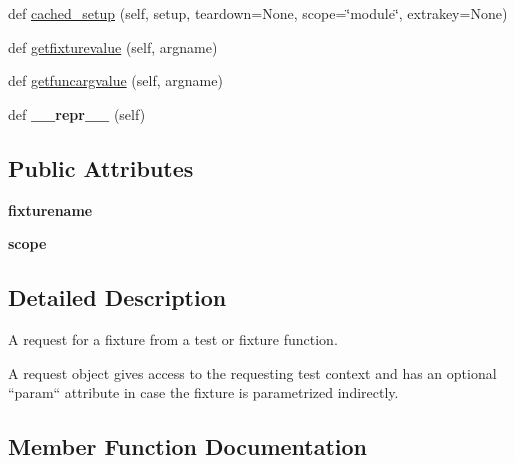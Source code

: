 \begin{DoxyCompactItemize}
def \hyperlink{class__pytest_1_1fixtures_1_1_fixture_request_a775e63459d22474875baaff278273220}{cached\+\_\+setup} (self, setup, teardown=None, scope=\char`\"{}module\char`\"{}, extrakey=None)
\item 
def \hyperlink{class__pytest_1_1fixtures_1_1_fixture_request_adcdc72e4da6ef0a8fe5a58f4f6800d2f}{getfixturevalue} (self, argname)
\item 
def \hyperlink{class__pytest_1_1fixtures_1_1_fixture_request_ad3fb29fde8a0deb9f3f84d9b7de5fa78}{getfuncargvalue} (self, argname)
\item 
\mbox{\label{class__pytest_1_1fixtures_1_1_fixture_request_a508e042f6218eada7cf94ede7c67f9e1}} 
def {\bfseries \+\_\+\+\_\+repr\+\_\+\+\_\+} (self)
\end{DoxyCompactItemize}
\subsection*{Public Attributes}
\begin{DoxyCompactItemize}
\item 
\mbox{\label{class__pytest_1_1fixtures_1_1_fixture_request_adaa4fc3a2be3498563ef8a8e96fb65e8}} 
{\bfseries fixturename}
\item 
\mbox{\label{class__pytest_1_1fixtures_1_1_fixture_request_ad89fd77bd665bb8e594f2a9e124e9122}} 
{\bfseries scope}
\end{DoxyCompactItemize}


\subsection{Detailed Description}
\begin{DoxyVerb}A request for a fixture from a test or fixture function.

A request object gives access to the requesting test context
and has an optional ``param`` attribute in case
the fixture is parametrized indirectly.
\end{DoxyVerb}
 

\subsection{Member Function Documentation}
\mbox{\label{class__pytest_1_1fixtures_1_1_fixture_request_abecbd3112fdcd3d0c541fd59066a3dc6}} 
